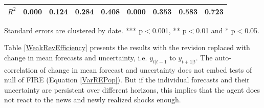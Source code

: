 \documentclass[]{article}
\begin{document}
\begin{table}
\begin{adjustbox}{width={24cm},totalheight={14cm}}
\begin{threeparttable}
\begin{tabular}{lllllllll}
						$R^2$                 & 0.000         & 0.124     & 0.284    & 0.408    & 0.000         & 0.353     & 0.583     & 0.723    \\
						\hline 
					\end{tabular} 
					\begin{tablenotes}
						\item Standard errors are clustered by date. *** p$<$0.001, ** p$<$0.01 and * p$<$0.05.
					\end{tablenotes}
				\end{threeparttable}
			\end{adjustbox}
		\end{table}
	
	
	Table \ref{WeakRevEfficiency} presents the results with the revision replaced with change in mean forecasts and uncertainty, i.e. $y_{t|t-1}$ to $y_{t+1|t}$. The auto-correlation of change in mean forecast and uncertainty does not embed tests of null of FIRE (Equation \ref{VarREPop}). But if the individual forecasts and their uncertainty are persistent over different horizons, this implies that the agent does not react to the news and newly realized shocks enough. 
	
\end{document}
